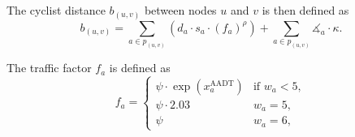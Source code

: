 \documentclass[letterpaper, 10 pt, conference]{ieeeconf}  %
\begin{document}
The cyclist distance $b_{(u,v)}$ between nodes $u$ and $v$ is then defined as
\begin{equation}
\label{cyclist_distance}
    b_{(u,v)} = \sum_{a \in p_{(u,v)}} \left( d_{a} \cdot s_{a} \cdot (f_{a})^{\rho} \right) +  \sum_{a \in p_{(u,v)}} \measuredangle_{a} \cdot \kappa.
\end{equation}

The traffic factor $f_{a}$ is defined as
\begin{equation}
\label{f_a}
f_{a} = 
     \begin{cases}
\psi \cdot \exp{\left( x^{\text{AADT}}_{a} \right)} & \text{if } w_{a} < 5, \\
\psi \cdot 2.03 & w_{a} = 5, \\
\psi & w_{a} = 6,
\end{cases}
\end{equation}



\end{document}
